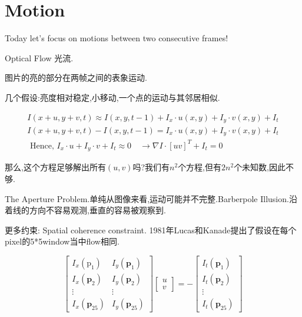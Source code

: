 \section{Motion}
	Today let’s focus on motions between two consecutive frames!
	
	Optical Flow 光流.
	
	图片的亮的部分在两帧之间的表象运动.
	
	几个假设:亮度相对稳定,小移动,一个点的运动与其邻居相似.
	
	\begin{equation}
		\begin{array}{l}
			I(x+u, y+v, t) \approx I(x, y, t-1)+I_{x} \cdot u(x, y)+I_{y} \cdot v(x, y)+I_{t} \\
			I(x+u, y+v, t)-I(x, y, t-1)=I_{x} \cdot u(x, y)+I_{y} \cdot v(x, y)+I_{t} \\
			\text { Hence, } I_{x} \cdot u+I_{y} \cdot v+I_{t} \approx 0 \quad \rightarrow \nabla I \cdot[u v]^{T}+I_{t}=0
		\end{array}
	\end{equation}

	那么,这个方程足够解出所有$(u, v)$吗?我们有$n^2$个方程,但有$2n^2$个未知数,因此不够.
	
	The Aperture Problem.单纯从图像来看,运动可能并不完整.Barberpole Illusion.沿着线的方向不容易观测,垂直的容易被观察到.
	
	更多约束: Spatial coherence constraint. 1981年Lucas和Kanade提出了假设在每个pixel的5*5window当中flow相同.
	
	\begin{equation}
		\left[\begin{array}{cc}
			I_{x}\left(\mathrm{p}_{1}\right) & I_{y}\left(\mathbf{p}_{1}\right) \\
			I_{x}\left(\mathbf{p}_{2}\right) & I_{y}\left(\mathbf{p}_{2}\right) \\
			\vdots & \vdots \\
			I_{x}\left(\mathbf{p}_{25}\right) & I_{y}\left(\mathbf{p}_{25}\right)
		\end{array}\right]\left[\begin{array}{l}
			u \\
			v
		\end{array}\right]=-\left[\begin{array}{c}
			I_{t}\left(\mathbf{p}_{1}\right) \\
			I_{t}\left(\mathbf{p}_{2}\right) \\
			\vdots \\
			I_{t}\left(\mathbf{p}_{25}\right)
		\end{array}\right]
	\end{equation}

